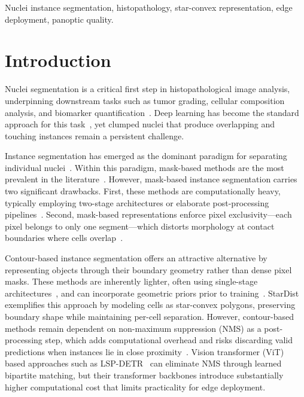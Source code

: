 \documentclass[conference]{IEEEtran}
\begin{document}
\begin{IEEEkeywords}
Nuclei instance segmentation, histopathology, star-convex representation, edge deployment, panoptic quality.
\end{IEEEkeywords}


\section{Introduction}

Nuclei segmentation is a critical first step in histopathological image analysis, underpinning downstream tasks such as tumor grading, cellular composition analysis, and biomarker quantification~\cite{basu2023survey}. Deep learning has become the standard approach for this task~\cite{basu2023survey,deng2020deep}, yet clumped nuclei that produce overlapping and touching instances remain a persistent challenge.

Instance segmentation has emerged as the dominant paradigm for separating individual nuclei~\cite{shephard2021simultaneous}. Within this paradigm, mask-based methods are the most prevalent in the literature~\cite{nunes2025survey}. However, mask-based instance segmentation carries two significant drawbacks. First, these methods are computationally heavy, typically employing two-stage architectures or elaborate post-processing pipelines~\cite{zhang2020mask}. Second, mask-based representations enforce pixel exclusivity---each pixel belongs to only one segment---which distorts morphology at contact boundaries where cells overlap~\cite{eppel2020computer}.

Contour-based instance segmentation offers an attractive alternative by representing objects through their boundary geometry rather than dense pixel masks. These methods are inherently lighter, often using single-stage architectures~\cite{zhang2020mask}, and can incorporate geometric priors prior to training~\cite{xie2019polarmask}. StarDist~\cite{schmidt2018cell} exemplifies this approach by modeling cells as star-convex polygons, preserving boundary shape while maintaining per-cell separation. However, contour-based methods remain dependent on non-maximum suppression (NMS) as a post-processing step, which adds computational overhead and risks discarding valid predictions when instances lie in close proximity~\cite{schmidt2018cell}. Vision transformer (ViT) based approaches such as LSP-DETR~\cite{pekar2026lsp} can eliminate NMS through learned bipartite matching, but their transformer backbones introduce substantially higher computational cost that limits practicality for edge deployment.
\end{document}

